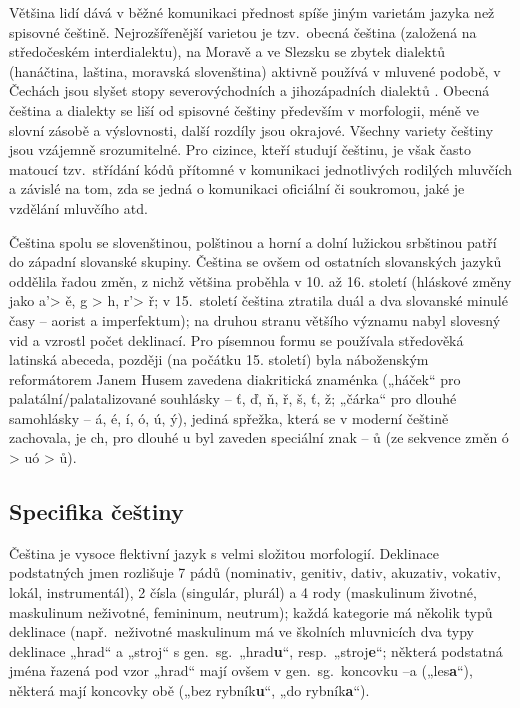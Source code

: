 \begin{multicols}{2}
Většina lidí dává v běžné komunikaci přednost spíše jiným varietám jazyka než spisovné češtině. Nejrozšířenější varietou je tzv.~obecná čeština (založená na středočeském interdialektu), na Moravě a ve Slezsku se zbytek dialektů (hanáčtina, laština, moravská slovenština) aktivně používá v mluvené podobě, v Čechách jsou slyšet stopy severovýchodních a jihozápadních dialektů \cite{Note3}. Obecná čeština a dialekty se liší od spisovné češtiny především v morfologii, méně ve slovní zásobě a výslovnosti, další rozdíly jsou okrajové. Všechny variety češtiny jsou vzájemně srozumitelné. Pro cizince, kteří studují češtinu, je však často matoucí tzv.~střídání kódů přítomné v komunikaci jednotlivých rodilých mluvčích a závislé na tom, zda se jedná o komunikaci oficiální či soukromou, jaké je vzdělání mluvčího atd.


Čeština spolu se slovenštinou, polštinou a horní a dolní lužickou srbštinou patří do západní slovanské skupiny. Čeština se ovšem od ostatních slovanských jazyků oddělila řadou změn, z nichž většina proběhla v 10. až 16. století (hláskové změny jako a’> ě, g > h, r’> ř; v 15.~století čeština ztratila duál a dva slovanské minulé časy – aorist a imperfektum); na druhou stranu většího významu nabyl slovesný vid a vzrostl počet deklinací. Pro písemnou formu se používala středověká latinská abeceda, později (na počátku 15. století) byla náboženským reformátorem Janem Husem zavedena diakritická znaménka („háček“ pro palatální/palatalizované souhlásky – ť, ď, ň, ř, š, ť, ž; „čárka“ pro dlouhé samohlásky – á, é, í, ó, ú, ý), jediná spřežka, která se v moderní češtině zachovala, je ch, pro dlouhé u byl zaveden speciální znak – ů (ze sekvence změn ó > uó > ů).

\subsection{Specifika češtiny}

Čeština je vysoce flektivní jazyk s velmi složitou morfologií. Deklinace podstatných jmen rozlišuje 7 pádů (nominativ, genitiv, dativ, akuzativ, vokativ, lokál, instrumentál), 2 čísla (singulár, plurál) a 4 rody (maskulinum životné, maskulinum neživotné, femininum, neutrum); každá kategorie má několik typů deklinace (např.~neživotné maskulinum má ve školních mluvnicích dva typy deklinace „hrad“ a „stroj“ s gen.~sg.~„hrad\textbf{u}“, resp.~„stroj\textbf{e}“; některá podstatná jména řazená pod vzor „hrad“ mají ovšem v gen.~sg.~koncovku –a („les\textbf{a}“), některá mají koncovky obě („bez rybník\textbf{u}“, „do rybník\textbf{a}“).


\end{multicols}
